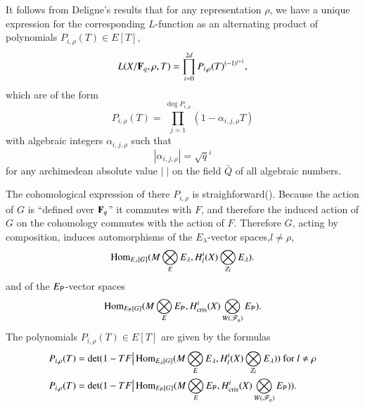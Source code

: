 It follows from Deligne's results that for any representation $\rho$, we have a unique expression for the corresponding $L$-function as an alternating product of polynomials $P_{i,\rho}(T) \in E [T]$,
$$
L(X/ \mathbf{F}_{q}, \rho, T) =\prod\limits^{2d}_{i=0} P_{i,\rho} (T)^{(-1)^{i+1}},
$$
which are of the form 
$$
P_{i,\rho} (T) = \prod\limits^{\deg P_{i,\rho}}_{j=1} (1 - \alpha_{i, j, \rho} T)
$$
with algebraic integers $\alpha_{i, j,\rho}$ such that 
$$
|\alpha_{i, j, \rho}| = \sqrt{q}^i
$$
for any archimedean absolute value $|\;|$ on the field $\bar{Q}$ of all algebraic numbers. 

The cohomological expression of there $P_{i,\rho}$ is straighforward\break  (\cf\cite{art6-key18}). Because the action of $G$ is ``defined over $\mathbf{F}_q$'' it commutes with $F$, and therefore the induced action of $G$ on the cohomology commutes with the action of $F$. Therefore $G$, acting by composition, induces automorphisms of the $E_\lambda$-vector spaces,$l \neq \rho$,
$$
\operatorname{Hom}_{E_\lambda [G]} (M\bigotimes\limits_E E_\lambda, H^i_l (X) \bigotimes\limits_{Z_l} E_\lambda).
$$
and of the $E_{\mathsf{P}}$-vector spaces
$$
\operatorname{Hom}_{E_{\mathsf{P}} [G]} (M \bigotimes\limits_{E} E_{\mathsf{P}}, H^i_{\text{cris}} (X) \bigotimes\limits_{W(\mathscr{F}_q)} E_{\mathsf{P}}). 
$$
The polynomials $P_{i, \rho} (T) \in E [T]$ are given by the formulas 
\begin{align*}
P_{i,\rho} (T) & = \det (1 - T F \big| \operatorname{Hom}_{E_\lambda [G]} (M \bigotimes\limits_{E} E_\lambda, H^i_l (X) \bigotimes\limits_{Z_l} E_\lambda )) \text{ for } l \neq \rho \\
P_{i, \rho} (T) & = \det (1 - TF \big| \operatorname{Hom}_{E_{\mathsf{P}} [G]} (M\bigotimes\limits_E E_{\mathsf{P}}, H^i_{\text{cris}} (X) \bigotimes\limits_{W (\mathscr{F}_q)} E_{\mathsf{P}})).
\end{align*}

